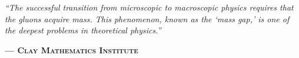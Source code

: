 \documentclass[12pt,a4paper,twoside]{article}
\theoremstyle{plain}
\theoremstyle{definition}
\theoremstyle{remark}
\begin{document}
\noindent
\begin{tcolorbox}[
    enhanced, colback=gray!6, frame hidden, boxrule=0pt, arc=1pt,
    drop shadow={opacity=0.04, shadow xshift=1.5pt, shadow yshift=1.5pt},
    left=20pt, right=20pt, top=12pt, bottom=12pt,
    fontupper=\rmfamily, nobeforeafter
]
    \makebox[0pt][l]{\hspace{-0.8em}\raisebox{-0.3em}{\textcolor{gray!20}{\fontsize{5em}{0}\selectfont $\Omega$}}}%
    \hspace{2.5em}%
    \begin{minipage}{\dimexpr\linewidth-3em}
        \itshape \color{dimgray}
        \setlength{\parskip}{0.3em}
        \large
        ``The successful transition from microscopic to macroscopic physics requires that the gluons acquire mass. This phenomenon, known as the `mass gap,' is one of the deepest problems in theoretical physics.''
        \par\vspace{0.4em}
        \hfill \footnotesize \upshape\textsc{\textbf{--- Clay Mathematics Institute}}
    \end{minipage}
\end{tcolorbox}

\vspace{0.4cm}
\end{document}
